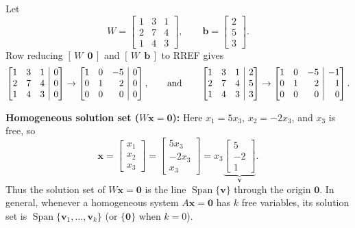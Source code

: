 \documentclass[10pt]{scrartcl}
\makeatletter
\newcommand{\aug}[2]{\left[\begin{array}{@{}#1@{}}#2\end{array}\right]}
\newcommand{\vv}[1]{\mathbf{#1}}
\DeclareMathOperator{\spn}{Span}
\makeatother
\begin{document}
\begin{example*}[Comparing $A\vv x=\vv 0$ and $A\vv x=\vv b$ in parametric vector form]
Let
\[
  W = \begin{bmatrix} 1 & 3 & 1 \\ 2 & 7 & 4 \\ 1 & 4 & 3 \end{bmatrix}, \qquad \vv b = \begin{bmatrix} 2 \\ 5 \\ 3 \end{bmatrix}.
\]
Row reducing $[\,W\ \ \vv 0\,]$ and $[\,W\ \ \vv b\,]$ to RREF gives
\[
  \aug{rrr|r}{1&3&1&0\\2&7&4&0\\1&4&3&0} \to \aug{rrr|r}{1&0&-5&0\\0&1&2&0\\0&0&0&0},
  \qquad\text{and}\qquad
  \aug{rrr|r}{1&3&1&2\\2&7&4&5\\1&4&3&3} \to \aug{rrr|r}{1&0&-5&-1\\0&1&2&1\\0&0&0&0}.
\]
\begin{itemize}
  \ii \textbf{Homogeneous solution set ($W\vv x=\vv 0$):} Here $x_1=5x_3$, $x_2=-2x_3$, and $x_3$ is free, so
  \[
    \vv x = \begin{bmatrix} x_1 \\ x_2 \\ x_3 \end{bmatrix} = \begin{bmatrix} 5x_3 \\ -2x_3 \\ x_3 \end{bmatrix} = x_3\underbrace{\begin{bmatrix} 5 \\ -2 \\ 1 \end{bmatrix}}_{\vv v}.
  \]
  Thus the solution set of $W\vv x=\vv 0$ is the line $\spn\{\vv v\}$ through the origin $\vv 0$. In general, whenever a homogeneous system $A\vv x=\vv 0$ has $k$ free variables, its solution set is $\spn\{\vv v_1,\dots,\vv v_k\}$ (or $\{\vv 0\}$ when $k=0$).
\end{itemize}
\end{example*}
\end{document}
